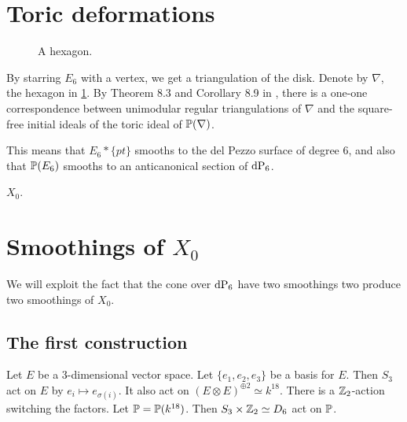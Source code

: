\section{Toric deformations}

\begin{figure}
\centering
{}
\caption{A hexagon.}
\label{fig:hexagon}
\end{figure}

By starring $E_6$ with a vertex, we get a triangulation of the disk. Denote by $\nabla$, the hexagon in  \cref{fig:hexagon}. By Theorem 8.3 and Corollary 8.9 in \cite{sturmfels}, there is a one-one correspondence between unimodular regular triangulations of $\nabla$ and the square-free initial ideals of the toric ideal of $\P(\nabla)$. 

This means that $E_6 \ast \{ pt \}$ smooths to the del Pezzo surface of degree $6$, and also that $\P(E_6)$ smooths to an anticanonical section of $\dP6$. 


$X_0$.

\section[Smoothings of X0]{Smoothings of $X_0$}

We will exploit the fact that the cone over $\dP6$ have two smoothings two produce two smoothings of $X_0$.

\subsection{The first construction}

Let $E$ be a 3-dimensional vector space. Let $\{e_1,e_2,e_3\}$ be a basis for $E$. Then $S_3$ act on $E$ by $e_i \mapsto e_{\sigma(i)}$. It also act on $(E \otimes E)^{\oplus 2}\simeq k^{18}$. There is a $\Z_2$-action switching the factors. Let $\P=\P(k^{18})$. Then $S_3 \times \Z_2\simeq D_6$ act on $\P$. 

